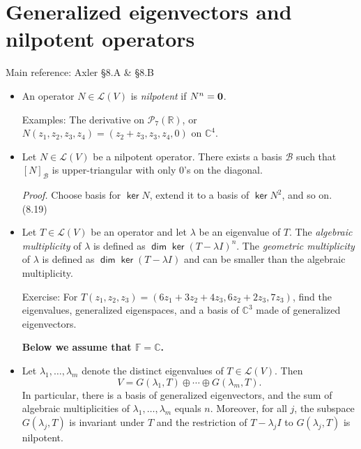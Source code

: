 \documentclass[11pt]{article}
\newcommand{\1}{\mathbf{1}}
\newcommand{\0}{\mathbf{0}}
\newcommand{\C}{\mathbb{C}}
\newcommand{\F}{\mathbb{F}}
\newcommand{\R}{\mathbb{R}}
\DeclareMathOperator{\myker}{\mathsf{ker}}
\DeclareMathOperator{\mydim}{\mathsf{dim}}
\renewcommand{\geq}{\geqslant}
\newcommand{\spitem}{\item[$\circ$]}
\begin{document}
{\begin{itemize}
\end{itemize}


\clearpage
\section{Generalized eigenvectors and nilpotent operators}

Main reference:
Axler \S8.A \& \S8.B

\begin{itemize}

\item

An operator $N\in\mathcal{L}(V)$ is \emph{nilpotent} if $N^n={\bf 0}$.

Examples:
The derivative on $\mathcal{P}_7(\R)$, or $N(z_1,z_2,z_3,z_4)=(z_2+z_3,z_3,z_4,0)$ on $\C^4$.

\item

Let $N\in\mathcal{L}(V)$ be a nilpotent operator. There exists a basis $\mathcal{B}$ such that $[N]_{\mathcal{B}}$ is upper-triangular with only 0's on the diagonal.

\emph{Proof.}
Choose basis for $\myker N$, extend it to a basis of $\myker N^2$, and so on.
\hfill
(8.19)

\item

Let $T\in\mathcal{L}(V)$ be an operator and let $\lambda$ be an eigenvalue of $T$. The \emph{algebraic multiplicity} of $\lambda$ is defined as $\mydim \myker (T-\lambda I)^n$. The \emph{geometric multiplicity} of $\lambda$ is defined as $\mydim \myker (T-\lambda I)$ and can be smaller than the algebraic multiplicity. 

Exercise:
For $T(z_1,z_2,z_3)= ( 6z_1 + 3z_2 + 4z_3 , 6z_2 + 2z_3 , 7z_3 )$, find the eigenvalues, generalized eigenspaces, and a basis of $\C^3$ made of generalized eigenvectors.

\bigskip
\hfil
\textbf{Below we assume that $\F=\C$.}
\medskip

\spitem                

Let $\lambda_1,\dots,\lambda_m$ denote the distinct eigenvalues of $T\in\mathcal{L}(V)$.
Then $$V= G(\lambda_1,T) \oplus \cdots \oplus G(\lambda_m, T).$$
In particular, there is a basis of generalized eigenvectors, and the sum of algebraic multiplicities of $\lambda_1,\dots,\lambda_m$ equals $n$.
Moreover, for all $j$, the subspace $G(\lambda_j,T)$ is invariant under $T$ and the restriction of $T-\lambda_j I$ to $G(\lambda_j,T)$ is nilpotent.


\end{itemize}}
\end{document}
